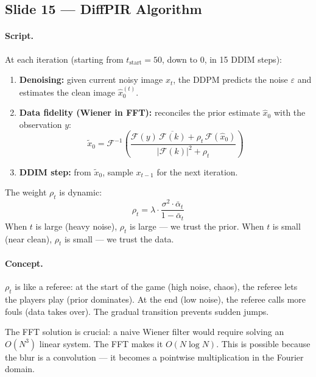 \documentclass[english,11pt,a4paper]{article}
\begin{document}
\subsection{Slide 15 --- DiffPIR Algorithm}

\paragraph{Script.}
At each iteration (starting from $t_{\text{start}}=50$, down to 0, in
15 DDIM steps):
\begin{enumerate}
\item \textbf{Denoising:} given current noisy image $x_t$, the DDPM
predicts the noise $\varepsilon$ and estimates the clean image
$\hat{x}_0^{(t)}$.
\item \textbf{Data fidelity (Wiener in FFT):} reconciles the prior
estimate $\hat{x}_0$ with the observation $y$:
\[
\tilde{x}_0 = \mathcal{F}^{-1}\!\left(
\frac{\mathcal{F}(y)\,\overline{\mathcal{F}(k)} + \rho_t\,\mathcal{F}(\hat{x}_0)}
{|\mathcal{F}(k)|^2 + \rho_t}
\right)
\]
\item \textbf{DDIM step:} from $\tilde{x}_0$, sample $x_{t-1}$ for
the next iteration.
\end{enumerate}

The weight $\rho_t$ is dynamic:
\[
\rho_t = \lambda \cdot \frac{\sigma^2 \cdot \bar{\alpha}_t}{1 - \bar{\alpha}_t}
\]
When $t$ is large (heavy noise), $\rho_t$ is large --- we trust the
prior. When $t$ is small (near clean), $\rho_t$ is small --- we trust
the data.

\paragraph{Concept.}
$\rho_t$ is like a referee: at the start of the game (high noise,
chaos), the referee lets the players play (prior dominates). At the
end (low noise), the referee calls more fouls (data takes over). The
gradual transition prevents sudden jumps.

The FFT solution is crucial: a naive Wiener filter would require
solving an $O(N^3)$ linear system. The FFT makes it $O(N \log N)$.
This is possible because the blur is a convolution --- it becomes
a pointwise multiplication in the Fourier domain.
\end{document}
